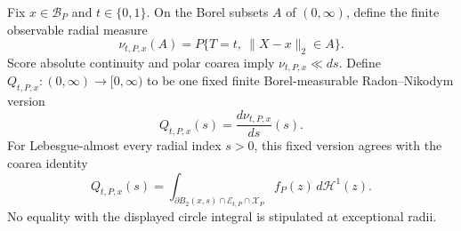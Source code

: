 Fix \(x\in\mathcal B_P\) and \(t\in\{0,1\}\).  On the Borel subsets \(A\) of \((0,\infty)\), define the finite observable radial measure
\[
 \nu_{t,P,x}(A)
 =P\{T=t,\ \lVert X-x\rVert_2\in A\}.
\]
Score absolute continuity and polar coarea imply \(\nu_{t,P,x}\ll ds\).  Define \(Q_{t,P,x}:(0,\infty)\to[0,\infty)\) to be one fixed finite Borel-measurable Radon--Nikodym version
\[
 Q_{t,P,x}(s)=\frac{d\nu_{t,P,x}}{ds}(s).
\]
For Lebesgue-almost every radial index \(s>0\), this fixed version agrees with the coarea identity
\[
 Q_{t,P,x}(s)
 =\int_{\partial B_2(x,s)\cap\mathcal E_{t,P}\cap\mathcal X_P}
 f_P(z)\,d\mathcal H^1(z).
\]
No equality with the displayed circle integral is stipulated at exceptional radii.